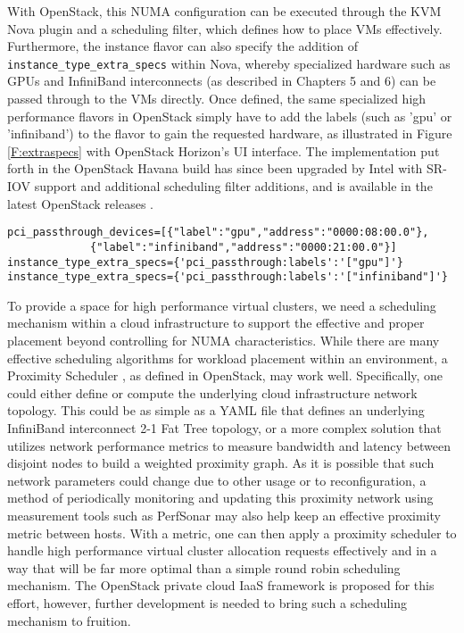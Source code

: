 With OpenStack, this NUMA configuration can be executed through the KVM Nova plugin and a scheduling filter, which defines how to place VMs effectively. Furthermore, the instance flavor can also specify the addition of \verb!instance_type_extra_specs! within Nova, whereby specialized hardware such as GPUs and InfiniBand interconnects (as described in Chapters 5 and 6) can be passed through to the VMs directly. Once defined, the same specialized high performance flavors in OpenStack simply have to add the labels (such as 'gpu' or 'infiniband') to the flavor to gain the requested hardware, as illustrated in Figure \ref{F:extraspecs} with OpenStack Horizon's UI interface.  The implementation put forth in the OpenStack Havana build has since been upgraded by Intel with SR-IOV support and additional scheduling filter additions, and is available in the latest OpenStack releases \cite{jiang2015}. 

\begin{verbatim}
pci_passthrough_devices=[{"label":"gpu","address":"0000:08:00.0"},
			 {"label":"infiniband","address":"0000:21:00.0"}]
instance_type_extra_specs={'pci_passthrough:labels':'["gpu"]'}
instance_type_extra_specs={'pci_passthrough:labels':'["infiniband"]'}
\end{verbatim}
 

To provide a space for high performance virtual clusters, we need a scheduling mechanism within a cloud infrastructure to support the effective and proper placement beyond controlling for NUMA characteristics. While there are many effective scheduling algorithms for workload placement within an environment, a Proximity Scheduler \cite{www-proximity-scheduler}, as defined in OpenStack, may work well. Specifically, one could either define or compute the underlying cloud infrastructure network topology. This could be as simple as a YAML file that defines an underlying InfiniBand interconnect 2-1 Fat Tree topology, or a more complex solution that utilizes network performance metrics to measure bandwidth and latency between disjoint nodes to build a weighted proximity graph. As it is possible that such network parameters could change due to other usage or to reconfiguration, a method of periodically monitoring and updating this proximity network using measurement tools such as PerfSonar \cite{hanemann2005perfsonar} may also help keep an effective proximity metric between hosts. With a metric, one can then apply a proximity scheduler to handle high performance virtual cluster allocation requests effectively and in a way that will be far more optimal than a simple round robin scheduling mechanism. The OpenStack private cloud IaaS framework is proposed for this effort, however, further development is needed to bring such a scheduling mechanism to fruition.  

